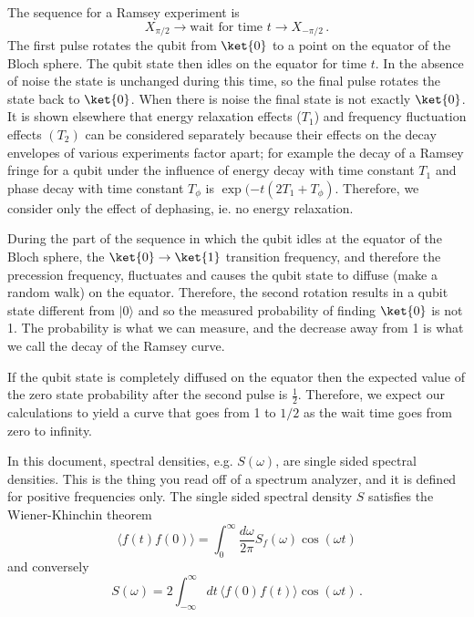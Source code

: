 
The sequence for a Ramsey experiment is
\begin{equation}
X_{\pi/2}\rightarrow\textrm{wait for time }t\rightarrow X_{-\pi/2} \, .
\end{equation}
The first pulse rotates the qubit from $\ket{0}$ to a point on the equator of the Bloch sphere.
The qubit state then idles on the equator for time $t$.
In the absence of noise the state is unchanged during this time, so the final pulse rotates the state back to $\ket{0}$.
When there is noise the final state is not exactly $\ket{0}$.
It is shown elsewhere that energy relaxation effects ($T_1$) and frequency fluctuation effects $(T_2)$ can be considered separately because their effects on the decay envelopes of various experiments factor apart; for example the decay of a Ramsey fringe for a qubit under the influence of energy decay with time constant $T_1$ and phase decay with time constant $T_\phi$ is $\exp(-t(2T_1 + T_\phi)$.
Therefore, we consider only the effect of dephasing, ie. no energy relaxation.

During the part of the sequence in which the qubit idles at the equator of the Bloch sphere, the $\ket{0}\rightarrow\ket{1}$ transition frequency, and therefore the precession frequency, fluctuates and causes the qubit state to diffuse (make a random walk)
on the equator.
Therefore, the second rotation results in a qubit state different from $|0\rangle$ and so the measured probability of finding $\ket{0}$ is not 1.
The probability is what we can measure, and the decrease away from 1 is what we call the decay of the Ramsey curve.

If the qubit state is completely diffused on the equator then the expected value of the zero state probability after the second pulse is $\frac{1}{2}$.
Therefore, we expect our calculations to yield a curve that goes from 1 to $1/2$ as the wait time goes from zero to infinity.


In this document, spectral densities, e.g. $S(\omega)$, are single sided spectral densities.
This is the thing you read off of a spectrum analyzer, and it is defined for positive frequencies only.
The single sided spectral density $S$ satisfies the Wiener-Khinchin theorem
\begin{equation}
  \langle f(t) f(0) \rangle = \int_0^\infty \frac{d\omega}{2\pi} S_f(\omega) \cos(\omega t)
\end{equation}
and conversely
\begin{equation}
  S(\omega) = 2 \int_{-\infty}^\infty dt \, \langle f(0) f(t) \rangle \cos(\omega t) \, .
\end{equation}

